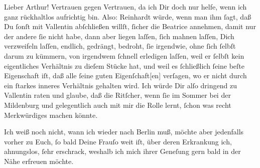 \pstart\center{}Lieber Arthur!\pend\vspace{0.5em}
\pstart
           Vertrauen gegen Vertrauen, da ich Dir doch nur helfe, wenn ich ganz rückhaltlos
               aufrichtig bin. Also: Reinhardt würde, wenn
               man ihm{ }ſagt, daß Du{ }ſonſt mit Vallentin
               abſchließen willſt,{ }ſicher die Beatrice
               annehmen, damit nur der andere{ }ſie nicht habe, dann aber liegen laſſen,{ }ſich mahnen
               laſſen, Dich verzweifeln laſſen, endlich, gedrängt, bedroht,{ }ſie irgendwie, ohne{ }ſich{ }ſelbſt darum zu kümmern, von irgendwem{ }ſchnell erledigen laſſen, weil er{ }ſelbſt kein
               eigentliches Verhältnis zu dieſem Stücke hat, und weil es{ }ſchließlich{ }ſeine beſte
               Eigenschaft iſt, daß alle{ }ſeine guten Eigenſchaft{[}en{]} verſagen, wo
               er {\pb}nicht durch ein{ }ſtarkes inneres Verhältnis
               gehalten wird. Ich würde Dir alſo dringend zu Vallentin raten und glaube, daß die Ritſcher, wenn{ }ſie im Sommer bei der Mildenburg und gelegentlich auch mit mir die Rolle lernt,{ }ſchon was recht
               Merkwürdiges machen könnte.\pend
           
\pstart
           Ich weiß noch nicht, wann ich wieder nach Berlin
               muß, möchte aber jedenfalls vorher zu Euch,{ }ſo bald Deine Frauſo weit iſt, über deren Erkrankung ich, ahnungslos,{ }ſehr erschrack, weshalb ich mich ihrer Geneſung gern bald in der Nähe erfreuen
               möchte.\pend
           
